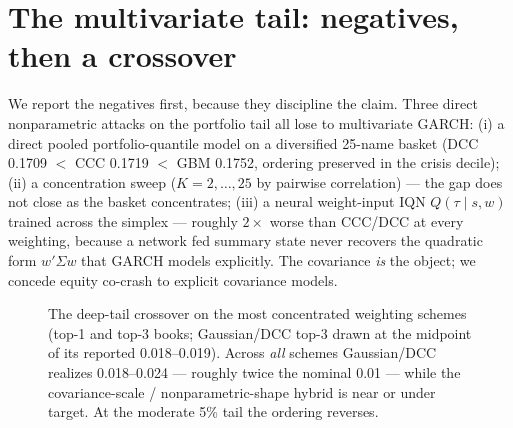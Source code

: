 \documentclass[11pt]{article}
\theoremstyle{remark}
\begin{document}
\section{The multivariate tail: negatives, then a crossover}
\label{sec:multivariate}

We report the negatives first, because they discipline the claim. Three
direct nonparametric attacks on the portfolio tail all lose to
multivariate GARCH: (i) a direct pooled portfolio-quantile model on a
diversified 25-name basket \citep[DCC/CCC --- multivariate GARCH with
dynamic (DCC) or constant (CCC) correlations across assets ---
benchmarks
after][]{engle2002dcc} (DCC 0.1709 $<$ CCC 0.1719 $<$ GBM 0.1752,
ordering preserved in the crisis decile); (ii) a concentration sweep
($K = 2,\dots,25$ by pairwise correlation) --- the gap does not close as
the basket concentrates; (iii) a neural weight-input IQN
$Q(\tau \mid s, w)$ trained across the simplex --- roughly $2\times$
worse than CCC/DCC at every weighting, because a network fed summary
state never recovers the quadratic form $w'\Sigma w$ that GARCH models
explicitly. The covariance \emph{is} the object; we concede equity
co-crash to explicit covariance models.

\begin{figure}[t]
\centering
{}
\caption{The deep-tail crossover on the most concentrated weighting
schemes (top-1 and top-3 books; Gaussian/DCC top-3 drawn at the midpoint
of its reported 0.018--0.019). Across \emph{all} schemes Gaussian/DCC
realizes 0.018--0.024 --- roughly twice the nominal 0.01 --- while the
covariance-scale / nonparametric-shape hybrid is near or under target.
At the moderate 5\% tail the ordering reverses.}
\label{fig:cocrash}
\end{figure}
\end{document}
